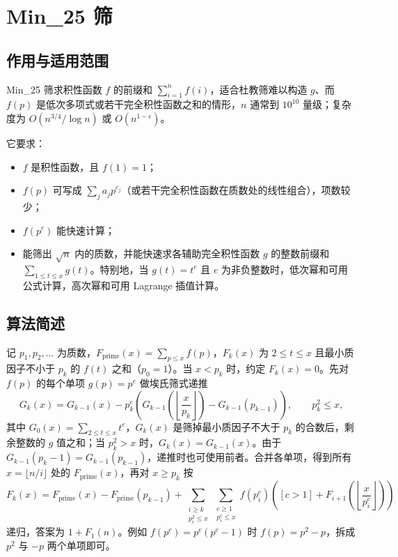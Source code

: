 \section{Min\_25 筛}\label{sec:min-25}

\subsection{作用与适用范围}

Min\_25 筛求积性函数 $f$ 的前缀和 $\sum_{i=1}^{n}f(i)$，适合杜教筛难以构造 $g$、而 $f(p)$ 是低次多项式或若干完全积性函数之和的情形，$n$ 通常到 $10^{10}$ 量级；复杂度为 $O(n^{3/4}/\log n)$ 或 $O(n^{1-\epsilon})$。

它要求：
\begin{itemize}[leftmargin=1.8em, itemsep=0.15em, topsep=0.2em]
    \item $f$ 是积性函数，且 $f(1)=1$；
    \item $f(p)$ 可写成 $\sum_j a_j p^{c_j}$（或若干完全积性函数在质数处的线性组合），项数较少；
    \item $f(p^c)$ 能快速计算；
    \item 能筛出 $\sqrt n$ 内的质数，并能快速求各辅助完全积性函数 $g$ 的整数前缀和 $\sum_{1\le t\le x}g(t)$。特别地，当 $g(t)=t^e$ 且 $e$ 为非负整数时，低次幂和可用公式计算，高次幂和可用 Lagrange 插值计算。
\end{itemize}

\subsection{算法简述}

记 $p_1,p_2,\dots$ 为质数，$F_{\mathrm{prime}}(x)=\sum_{p\le x}f(p)$，$F_k(x)$ 为 $2\le t\le x$ 且最小质因子不小于 $p_k$ 的 $f(t)$ 之和（$p_0=1$）。当 $x<p_k$ 时，约定 $F_k(x)=0$。先对 $f(p)$ 的每个单项 $g(p)=p^e$ 做埃氏筛式递推
$$
G_k(x)=G_{k-1}(x)-p_k^e\left(G_{k-1}\left(\left\lfloor\frac{x}{p_k}\right\rfloor\right)-G_{k-1}(p_{k-1})\right),\qquad p_k^2\le x,
$$
其中 $G_0(x)=\sum_{2\le t\le x}t^e$，$G_k(x)$ 是筛掉最小质因子不大于 $p_k$ 的合数后，剩余整数的 $g$ 值之和；当 $p_k^2>x$ 时，$G_k(x)=G_{k-1}(x)$。由于 $G_{k-1}(p_k-1)=G_{k-1}(p_{k-1})$，递推时也可使用前者。合并各单项，得到所有 $x=\lfloor n/i\rfloor$ 处的 $F_{\mathrm{prime}}(x)$，再对 $x\ge p_k$ 按
$$
F_k(x)=F_{\mathrm{prime}}(x)-F_{\mathrm{prime}}(p_{k-1})
+\sum_{\substack{i\ge k\\p_i^2\le x}}\sum_{\substack{c\ge1\\p_i^c\le x}}
f(p_i^c)\left([c>1]+F_{i+1}\left(\left\lfloor\frac{x}{p_i^c}\right\rfloor\right)\right)
$$
递归，答案为 $1+F_1(n)$。例如 $f(p^c)=p^c(p^c-1)$ 时 $f(p)=p^2-p$，拆成 $p^2$ 与 $-p$ 两个单项即可。

